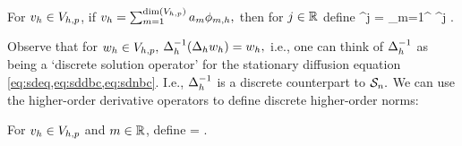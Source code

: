 \label{def:hodd}
For $v_{h} \in V_{h,p}$, if $\vh = \sum_{m=1}^{\dimVhp} \am \phimh,$ then for $j \in \mathbb R$ define
\beqs
\Deltah^j \vh = \sum_{m=1}^{\dimVhp} \lambdamh^j \am \phimh.
\eeqs


\ede
Observe that for $w_{h} \in V_{h,p},$ $\DeltahI\mleft(\Deltah\wh\mright) = \wh,$ i.e., one can think of $\Delta_{h}^{-1}$ as being a `discrete solution operator' for the stationary diffusion equation \cref{eq:sdeq,eq:sddbc,eq:sdnbc}. I.e., $\Delta_{h}^{-1}$ is a discrete counterpart to $\mathcal S_{n}.$
We can use the higher-order derivative operators to define discrete higher-order norms:

For $v_{h} \in V_{h,p}$ and $m \in \mathbb R$, define
\beqs
\Nmhn{\vh} = .
\eeqs
\ede




